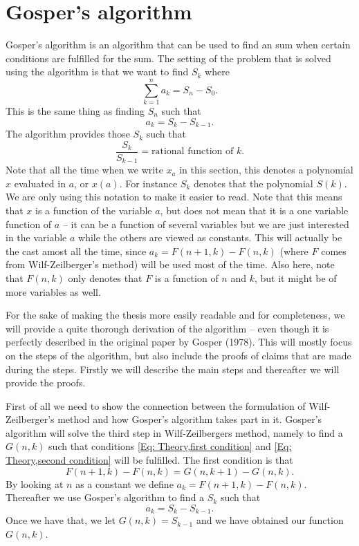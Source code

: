 \section{Gosper's algorithm}
Gosper's algorithm is an algorithm that can be used to find an sum when certain conditions are fulfilled for the sum. The setting of the problem that is solved using the algorithm is that we want to find $S_k$ where
\begin{equation}\label{Eq: Theory,Gosper1}
  \sum_{k=1}^n a_k = S_n-S_0.
\end{equation}
This is the same thing as finding $S_n$ such that
\begin{equation}\label{Eq: Theory,Gosper2}
  a_k = S_k - S_{k-1}.
\end{equation}
The algorithm provides those $S_k$ such that
\begin{equation}
  \frac{S_k}{S_{k-1}} = \text{rational function of } k.
\end{equation}
Note that all the time when we write $x_a$ in this section, this denotes a polynomial $x$ evaluated in $a$, or $x(a)$. For instance $S_k$ denotes that the polynomial $S(k)$. We are only using this notation to make it easier to read. Note that this means that $x$ is a function of the variable $a$, but does not mean that it is a one variable function of $a$ -- it can be a function of several variables but we are just interested in the variable $a$ while the others are viewed as constants. This will actually be the cast amost all the time, since $a_k=F(n+1,k)-F(n,k)$ (where $F$ comes from Wilf-Zeilberger's method) will be used most of the time. Also here, note that $F(n,k)$ only denotes that $F$ is a function of $n$ and $k$, but it might be of more variables as well.

For the sake of making the thesis more easily readable and for completeness, we will provide a quite thorough derivation of the algorithm -- even though it is perfectly described in the original paper by Gosper (1978). This will mostly focus on the steps of the algorithm, but also include the proofs of claims that are made during the steps. Firstly we will describe the main steps and thereafter we will provide the proofs.

First of all we need to show the connection between the formulation of Wilf-Zeilberger's method and how Gosper's algorithm takes part in it. Gosper's algorithm will solve the third step in Wilf-Zeilbergers method, namely to find a $G(n,k)$ such that conditions \ref{Eq: Theory,first condition} and \ref{Eq: Theory,second condition} will be fulfilled. The first condition is that
\begin{equation}
  F(n+1,k)-F(n,k) = G(n,k+1)-G(n,k).
\end{equation}
By looking at $n$ as a constant we define $a_k=F(n+1,k)-F(n,k)$. Thereafter we use Gosper's algorithm to find a $S_k$ such that
\begin{equation}
  a_k = S_k-S_{k-1}.
\end{equation}
Once we have that, we let $G(n,k) = S_{k-1}$ and we have obtained our function $G(n,k)$.

